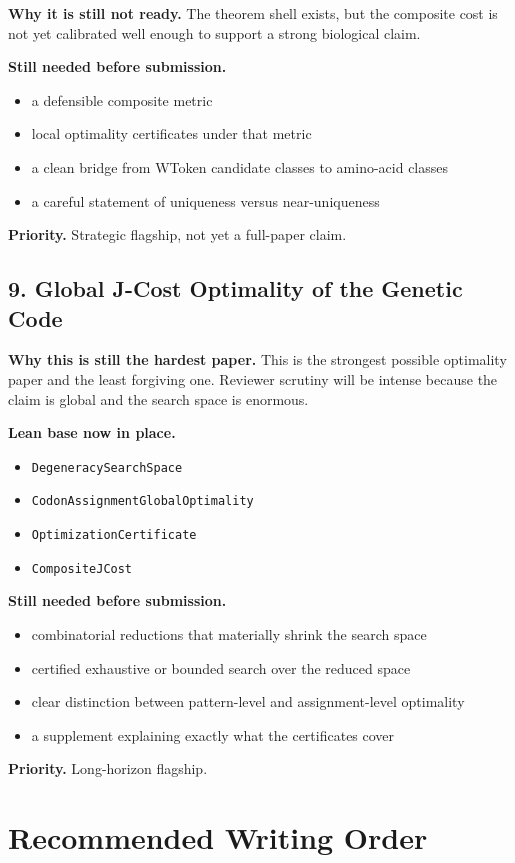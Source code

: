 \documentclass[11pt]{article}
\begin{document}
\textbf{Why it is still not ready.} The theorem shell exists, but the composite cost is not yet calibrated well enough to support a strong biological claim.

\textbf{Still needed before submission.}
\begin{itemize}
\item a defensible composite metric
\item local optimality certificates under that metric
\item a clean bridge from WToken candidate classes to amino-acid classes
\item a careful statement of uniqueness versus near-uniqueness
\end{itemize}

\textbf{Priority.} Strategic flagship, not yet a full-paper claim.

\subsection*{9. Global J-Cost Optimality of the Genetic Code}
\textbf{Why this is still the hardest paper.} This is the strongest possible optimality paper and the least forgiving one. Reviewer scrutiny will be intense because the claim is global and the search space is enormous.

\textbf{Lean base now in place.}
\begin{itemize}
\item \texttt{DegeneracySearchSpace}
\item \texttt{CodonAssignmentGlobalOptimality}
\item \texttt{OptimizationCertificate}
\item \texttt{CompositeJCost}
\end{itemize}

\textbf{Still needed before submission.}
\begin{itemize}
\item combinatorial reductions that materially shrink the search space
\item certified exhaustive or bounded search over the reduced space
\item clear distinction between pattern-level and assignment-level optimality
\item a supplement explaining exactly what the certificates cover
\end{itemize}

\textbf{Priority.} Long-horizon flagship.

\section*{Recommended Writing Order}
\end{document}
